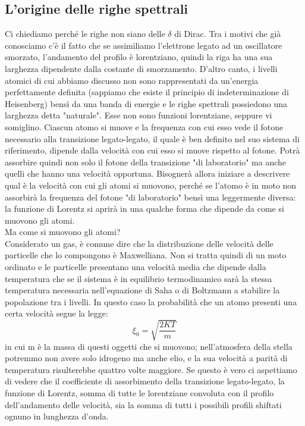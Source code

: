 \documentclass[a4paper,11pt]{article}
\begin{document}
    \subsection{L'origine delle righe spettrali}
    Ci chiediamo perché le righe non siano delle ${\delta}$ di Dirac. Tra i motivi che già conosciamo c'è il fatto che se assimiliamo l'elettrone legato ad un oscillatore smorzato, l'andamento del profilo è lorentziano, quindi la riga ha una sua larghezza dipendente dalla costante di smorzamento. D'altro canto, i livelli atomici di cui abbiamo discusso non sono rappresentati da un'energia perfettamente definita (sappiamo che esiste il principio di indeterminazione di Heisenberg) bensì da una banda di energie e le righe spettrali possiedono una larghezza detta "naturale". Esse non sono funzioni lorentziane, seppure vi somiglino. Ciascun atomo si muove e la frequenza con cui esso vede il fotone necessario alla transizione legato-legato, il quale è ben definito nel suo sistema di riferimento, dipende dalla velocità con cui esso si muove rispetto al fotone. Potrà assorbire quindi non solo il fotone della transizione "di laboratorio" ma anche quelli che hanno una velocità opportuna. Bisognerà allora iniziare a descrivere qual è la velocità con cui gli atomi si muovono, perché se l'atomo è in moto non assorbirà la frequenza del fotone "di laboratorio" bensì una leggermente diversa: la funzione di Lorentz si aprirà in una qualche forma che dipende da come si muovono gli atomi.\\Ma come si muovono gli atomi?\\ Considerato un gas, è comune dire che la distribuzione delle velocità delle particelle che lo compongono è Maxwelliana. Non si tratta quindi di un moto ordinato e le particelle presentano una velocità media che dipende dalla temperatura che se il sistema è in equilibrio termodinamico sarà la stessa temperatura necessaria nell'equazione di Saha o di Boltzmann a stabilire la popolazione tra i livelli. In questo caso la probabilità che un atomo presenti una certa velocità segue la legge:
    $$
        {\xi_0} = \sqrt{\frac{2KT}{m}}
    $$
    in cui m è la massa di questi oggetti che si muovono; nell'atmosfera della stella potremmo non avere solo idrogeno ma anche elio, e la sua velocità a parità di temperatura risulterebbe quattro volte maggiore. Se questo è vero ci aspettiamo di vedere che il coefficiente di assorbimento della transizione legato-legato, la funzione di Lorentz, somma di tutte le lorentziane convoluta con il profilo dell'andamento delle velocità, sia la somma di tutti i possibili profili shiftati ognuno in lunghezza d'onda.
\end{document}
